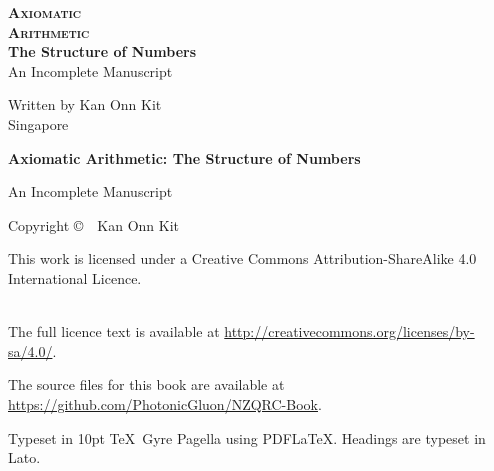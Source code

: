 \makeatletter
\newcommand*{\rom}[1]{\Ifstr{#1}{0}{0}{\expandafter\@slowromancap\romannumeral #1@}}
\makeatother

\newcommand*{\editiontext}{An Incomplete Manuscript}


\begin{titlepage}
    \null\vspace{4cm}
    \begin{raggedleft}
        {\fontsize{36pt}{0pt}\selectfont \textbf{\textsc{Axiomatic}}}\\
        \vspace{0.1cm}
        {\fontsize{36pt}{0pt}\selectfont \textbf{\textsc{Arithmetic}}}\\
        \vspace{0.3cm}
        {\fontsize{20pt}{0pt}\selectfont \textbf{The Structure of Numbers}}\\

        \vspace{0.5cm}
            {\fontsize{16pt}{0pt}\selectfont \editiontext}\\
    \end{raggedleft}
    \vspace*{\fill}
\end{titlepage}

\newpage{}

\clearpage\null\vfill
\thispagestyle{empty}
\begin{minipage}[b]{0.9\textwidth}
    \footnotesize\raggedright
    \setlength{\parskip}{0.5\baselineskip}

    Written by Kan Onn Kit\\
    Singapore
    \vspace{5cm}

    \textbf{Axiomatic Arithmetic: The Structure of Numbers}\par
    \editiontext
    \vspace{0.3cm}

    Copyright \copyright \ \the\year\ Kan Onn Kit\par
    This work is licensed under a Creative Commons Attribution-ShareAlike 4.0 International Licence.\par
    \\
    The full licence text is available at \url{http://creativecommons.org/licenses/by-sa/4.0/}.\par
    The source files for this book are available at \url{https://github.com/PhotonicGluon/NZQRC-Book}.
    \vspace{0.3cm}

    Typeset in 10pt \TeX~Gyre Pagella using PDF\LaTeX. Headings are typeset in Lato.
\end{minipage}

